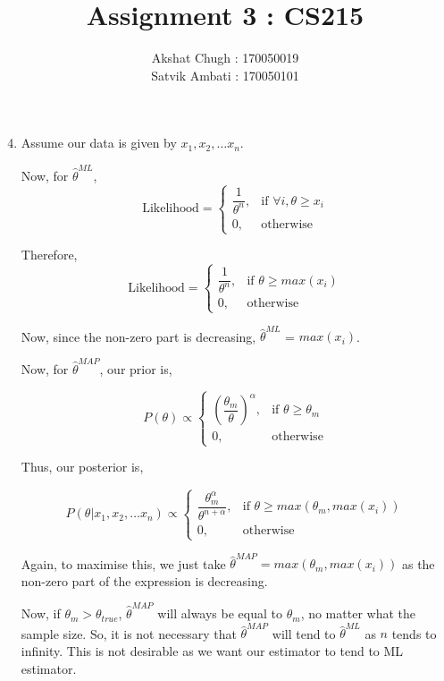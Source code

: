 \documentclass[12pt]{article}
\title{Assignment 3 : CS215}
\author{Akshat Chugh : 170050019 \\ Satvik Ambati : 170050101}
\begin{document}
\maketitle
\begin{enumerate}
	\setcounter{enumi}{3}
	\item 
	Assume our data is given by $x_1, x_2, \dots x_n$.
	
	Now, for $\hat{\theta}^{ML}$, 
	$$
	\text{Likelihood} = \begin{cases}
		\dfrac{1}{\theta^n}, & \text{if } \forall i,  \theta \geq x_i \\
		0, & \text{otherwise}
	\end{cases}$$
	
	Therefore, 
	$$
	\text{Likelihood} = \begin{cases}
	\dfrac{1}{\theta^n}, & \text{if } \theta \geq max(x_i) \\
	0, & \text{otherwise}
	\end{cases}$$
	
	Now, since the non-zero part is decreasing, $\hat{\theta}^{ML}$ = $max(x_i)$. 
	
	
	Now, for $\hat{\theta}^{MAP}$, our prior is,
	
	$$
	P(\theta) \propto \begin{cases}
	\left(\dfrac{\theta_m}{\theta}\right)^\alpha, & \text{if } \theta \geq \theta_m \\
	0, & \text{otherwise}
	\end{cases}$$
	 
	Thus, our posterior is,
	
	$$
	P(\theta | x_1, x_2, \dots x_n) \propto \begin{cases}
	\dfrac{\theta_m^\alpha}{\theta^{n+\alpha}}, & \text{if } \theta \geq max(\theta_m, max(x_i)) \\
	0, & \text{otherwise}
	\end{cases}$$
	
	Again, to maximise this, we just take $\hat{\theta}^{MAP} = max(\theta_m, max(x_i))$ as the non-zero part of the expression is decreasing.
	
	Now, if $\theta_m > \theta_{true}$, $\hat{\theta}^{MAP}$ will always be equal to $\theta_m$, no matter what the sample size. So, it is not necessary that $\hat{\theta}^{MAP}$ will tend to $\hat{\theta}^{ML}$ as $n$ tends to infinity. This is not desirable as we want our estimator to tend to ML estimator.
	\newpage
	

\end{enumerate}
\end{document}
